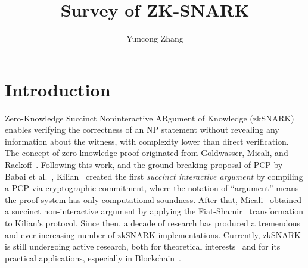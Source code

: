 \documentclass[12pt]{article}
\title{Survey of ZK-SNARK}
\author{Yuncong Zhang}
\theoremstyle{plain}
\theoremstyle{definition}
\theoremstyle{remark}
\begin{document}
\maketitle
\begin{abstract}
\end{abstract}

\section{Introduction}

Zero-Knowledge Succinct Noninteractive ARgument of Knowledge (zkSNARK) enables verifying the correctness of an NP statement without revealing any information about the witness, with complexity lower than direct verification.
The concept of zero-knowledge proof originated from Goldwasser, Micali, and Rackoff~\cite{gmr1989knowledge}.
Following this work, and the ground-breaking proposal of PCP by Babai et al.~\cite{bfls1991checking}, Kilian~\cite{kilian1992note} created the first \emph{succinct interactive argument} by compiling a PCP via cryptographic commitment, where the notation of ``argument'' means the proof system has only computational soundness.
After that, Micali~\cite{micali2000computationally} obtained a succinct non-interactive argument by applying the Fiat-Shamir~\cite{FiatS86} transformation to Kilian's protocol.
Since then, a decade of research has produced a tremendous and ever-increasing number of zkSNARK implementations.
Currently, zkSNARK is still undergoing active research, both for theoretical interests~\cite{NaorY90} and for its practical applications, especially in Blockchain~\cite{Ben-SassonCG0MTV14}.
\end{document}
